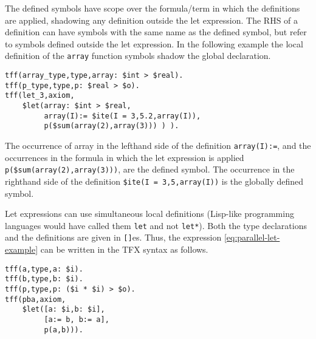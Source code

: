 \documentclass{easychair}
\begin{document}
The defined symbols have scope over the formula/term in which the definitions 
are applied, shadowing any definition outside the let expression. 
The RHS of a definition can have symbols with the same name as the defined 
symbol, but refer to symbols defined outside the let expression. In the following example the local definition of the {\tt array} function symbols shadow the global declaration.
\begin{verbatim}
tff(array_type,type,array: $int > $real).
tff(p_type,type,p: $real > $o).
tff(let_3,axiom,
    $let(array: $int > $real,
         array(I):= $ite(I = 3,5.2,array(I)),
         p($sum(array(2),array(3))) ) ).
\end{verbatim}

The occurrence of array in the lefthand side of the definition 
{\tt array(I):=}, and the occurrences in the formula in which the let 
expression is applied {\tt p(\$sum(array(2),array(3)))}, are the defined 
symbol. 
The occurrence in the righthand side of the definition 
{\tt \$ite(I = 3,5,array(I))} is the globally defined symbol.

Let expressions can use simultaneous local definitions
(Lisp-like programming languages would have called them \verb'let' and not \verb'let*').
Both the type declarations and the definitions are given in {\tt []}es. Thus, the expression \ref{eq:parallel-let-example} can be written in the TFX syntax as follows.
\begin{verbatim}
tff(a,type,a: $i).
tff(b,type,b: $i).
tff(p,type,p: ($i * $i) > $o).
tff(pba,axiom,
    $let([a: $i,b: $i],
         [a:= b, b:= a],
         p(a,b))).
\end{verbatim}
\end{document}
